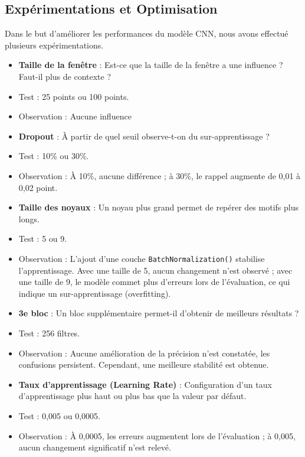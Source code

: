 \documentclass[12pt,a4paper]{report}
\begin{document}
\subsection{Expérimentations et Optimisation}
Dans le but d'améliorer les performances du modèle CNN, nous avons effectué plusieurs expérimentations.
\begin{itemize}
    \item \textbf{Taille de la fenêtre} : Est-ce que la taille de la fenêtre a une influence ? Faut-il plus de contexte ?
    \item Test : 25 points ou 100 points.
    \item Observation : Aucune influence
\end{itemize}
\begin{itemize}
    \item \textbf{Dropout} : À partir de quel seuil observe-t-on du sur-apprentissage ?
    \item Test : 10\% ou 30\%.
    \item Observation : À 10\%, aucune différence ; à 30\%, le rappel augmente de 0,01 à 0,02 point.
\end{itemize}
\begin{itemize}
    \item \textbf{Taille des noyaux} : Un noyau plus grand permet de repérer des motifs plus longs.
    \item Test : 5 ou 9.
    \item Observation : L'ajout d'une couche \texttt{BatchNormalization()} stabilise l'apprentissage. Avec une taille de 5, aucun changement n'est observé ; avec une taille de 9, le modèle commet plus d'erreurs lors de l'évaluation, ce qui indique un sur-apprentissage (overfitting).
\end{itemize}
\begin{itemize}
    \item \textbf{3e bloc} : Un bloc supplémentaire permet-il d'obtenir de meilleurs résultats ?
    \item Test : 256 filtres.
    \item Observation : Aucune amélioration de la précision n'est constatée, les confusions persistent. Cependant, une meilleure stabilité est obtenue.
\end{itemize}
\begin{itemize}
    \item \textbf{Taux d'apprentissage (Learning Rate)} : Configuration d'un taux d'apprentissage plus haut ou plus bas que la valeur par défaut.
    \item Test : 0,005 ou 0,0005.
    \item Observation : À 0,0005, les erreurs augmentent lors de l'évaluation ; à 0,005, aucun changement significatif n'est relevé.
\end{itemize}
\end{document}
